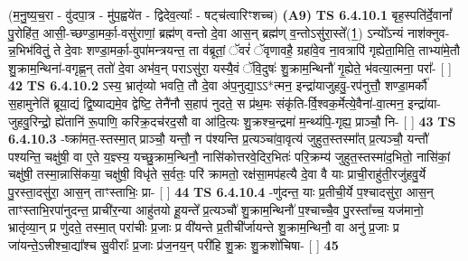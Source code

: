 \documentclass[17pt]{extarticle}
\begin{document}
                  \newline
                      (म॒नु॒ष्य॒च॒रा - वु॑दपा॒त्र - मु॑प॒ह्वये॑त - द्विदेव॒त्याः᳚ - षट्च॑त्वारिꣳशच्च)  \textbf{(A9)} \newline \newline
                                        \textbf{ TS 6.4.10.1} \newline
                  बृह॒स्पति॑र्दे॒वानां᳚ पु॒रोहि॑त॒ आसी॒-च्छण्डा॒मर्का॒-वसु॑राणां॒ ब्रह्म॑ण् वन्तो दे॒वा आस॒न् ब्रह्म॑ण् व॒न्तोऽसु॑रा॒स्ते᳚(1॒) ऽन्यो᳚ऽन्यं नाश॑क्नुव-न्न॒भिभ॑वितुं॒ ते दे॒वाः शण्डा॒मर्का॒-वुपा॑मन्त्रयन्त॒ ता व॑ब्रूतां॒ ॅवरं॑ ॅवृणावहै॒ ग्रहा॑वे॒व ना॒वत्रापि॑ गृह्येता॒मिति॒ ताभ्या॑मे॒तौ शु॒क्राम॒न्थिना॑-वगृह्ण॒न् ततो॑ दे॒वा अभ॑व॒न् पराऽसु॑रा॒ यस्यै॒वं ॅवि॒दुषः॑ शु॒क्राम॒न्थिनौ॑ गृ॒ह्येते॒ भ॑वत्या॒त्मना॒ परा᳚- [  ] \textbf{  42} \newline
                  \newline
                                \textbf{ TS 6.4.10.2} \newline
                  ऽस्य॒ भ्रातृ॑व्यो भवति॒ तौ दे॒वा अ॑प॒नुद्या॒ऽऽ*त्मन॒ इन्द्रा॑याजुहवु॒-रप॑नुत्तौ॒ शण्डा॒मर्कौ॑ स॒हामुनेति॑ ब्रूया॒द्यं द्वि॒ष्याद्यमे॒व द्वेष्टि॒ तेनै॑नौ स॒हाप॑ नुदते॒ स प्र॑थ॒मः संकृ॑ति-र्वि॒श्वक॒र्मेत्ये॒वैना॑-वा॒त्मन॒ इन्द्रा॑या-जुहवु॒रिन्द्रो॒ ह्ये॑तानि॑ रू॒पाणि॒ करि॑क्र॒दच॑रद॒सौ वा आ॑दि॒त्यः शु॒क्रश्च॒न्द्रमा॑ म॒न्थ्य॑पि॒-गृह्य॒ प्राञ्चौ॒ नि- [  ] \textbf{  43} \newline
                  \newline
                                \textbf{ TS 6.4.10.3} \newline
                  -ष्क्रा॑मत॒-स्तस्मा॒त् प्राञ्चौ॒ यन्तौ॒ न प॑श्यन्ति प्र॒त्यञ्चा॑वा॒वृत्य॑ जुहुत॒स्तस्मा᳚त् प्र॒त्यञ्चौ॒ यन्तौ॑ पश्यन्ति॒ चक्षु॑षी॒ वा ए॒ते य॒ज्ञ्स्य॒ यच्छु॒क्राम॒न्थिनौ॒ नासि॑कोत्तरवे॒दिर॒भितः॑ परि॒क्रम्य॑ जुहुत॒स्तस्मा॑द॒भितो॒ नासि॑कां॒ चक्षु॑षी॒ तस्मा॒न्नासि॑कया॒ चक्षु॑षी॒ विधृ॑ते स॒र्वतः॒ परि॑ क्रामतो॒ रक्ष॑सा॒मप॑हत्यै दे॒वा वै याः प्राची॒राहु॑ती॒रजु॑हवु॒र्ये पु॒रस्ता॒दसु॑रा॒ आस॒न् ताꣳस्ताभिः॒ प्रा- [  ] \textbf{  44} \newline
                  \newline
                                \textbf{ TS 6.4.10.4} \newline
                  -णु॑दन्त॒ याः प्र॒तीची॒र्ये प॒श्चादसु॑रा॒ आस॒न् ताꣳस्ताभि॒रपा॑नुदन्त॒ प्राची॑र॒न्या आहु॑तयो हू॒यन्ते᳚ प्र॒त्यञ्चौ॑ शु॒क्राम॒न्थिनौ॑ प॒श्चाच्चै॒व पु॒रस्ता᳚च्च॒ यज॑मानो॒ भ्रातृ॑व्या॒न् प्र णु॑दते॒ तस्मा॒त् परा॑चीः प्र॒जाः प्र वी॑यन्ते प्र॒तीची᳚र्जायन्ते शु॒क्राम॒न्थिनौ॒ वा अनु॑ प्र॒जाः प्र जा॑यन्ते॒ऽत्त्रीश्चा॒द्या᳚श्च सु॒वीराः᳚ प्र॒जाः प्र॑ज॒नय॒न् परी॑हि शु॒क्रः शु॒क्रशो॑चिषा- [  ] \textbf{  45} \newline
\end{document}
